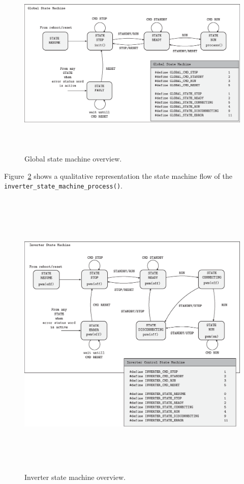 \documentclass[11pt,a4paper,oneside]{book}
\numberwithin{equation}{section}
\theoremstyle{it}
\theoremstyle{definition}
\begin{document}
\begin{figure}[H]
	\centering
	\includegraphics[height= 260pt, angle = 0, 
	keepaspectratio]{figures/firmware_arch/global_state_machine.eps}
	\captionsetup{width=0.5\textwidth, font=small}	
	\caption{Global state machine overview.}
	\label{global_state_machine}
\end{figure}
Figure~\ref{inverter_state_machine} shows a qualitative representation the state machine flow of the \\ {\selectfont \verb+inverter_state_machine_process()+}.
\begin{figure}[H]
	\centering
	\includegraphics[height= 400pt, angle = 0, 
	keepaspectratio]{figures/firmware_arch/inverter_state_machine.eps}
	\captionsetup{width=0.5\textwidth, font=small}	
	\caption{Inverter state machine overview.}
	\label{inverter_state_machine}
\end{figure}
\end{document}
